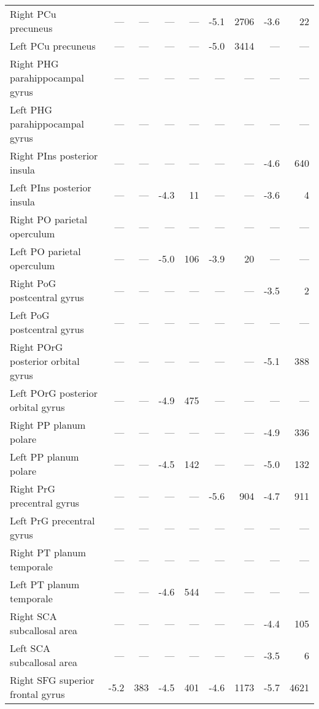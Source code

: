 \documentclass[]{article}
\begin{document}
\begin{table}[ht]
{\begin{tabular}{lrrrrrrrr}
  Right PCu   precuneus & --- & --- & --- & --- & -5.1 & 2706 & -3.6 & 22 \\ 
  Left PCu   precuneus & --- & --- & --- & --- & -5.0 & 3414 & --- & --- \\ 
  Right PHG   parahippocampal gyrus & --- & --- & --- & --- & --- & --- & --- & --- \\ 
  Left PHG   parahippocampal gyrus & --- & --- & --- & --- & --- & --- & --- & --- \\ 
  Right PIns  posterior insula & --- & --- & --- & --- & --- & --- & -4.6 & 640 \\ 
  Left PIns  posterior insula & --- & --- & -4.3 & 11 & --- & --- & -3.6 & 4 \\ 
  Right PO    parietal operculum & --- & --- & --- & --- & --- & --- & --- & --- \\ 
  Left PO    parietal operculum & --- & --- & -5.0 & 106 & -3.9 & 20 & --- & --- \\ 
  Right PoG   postcentral gyrus & --- & --- & --- & --- & --- & --- & -3.5 & 2 \\ 
  Left PoG   postcentral gyrus & --- & --- & --- & --- & --- & --- & --- & --- \\ 
  Right POrG  posterior orbital gyrus & --- & --- & --- & --- & --- & --- & -5.1 & 388 \\ 
  Left POrG  posterior orbital gyrus & --- & --- & -4.9 & 475 & --- & --- & --- & --- \\ 
  Right PP    planum polare & --- & --- & --- & --- & --- & --- & -4.9 & 336 \\ 
  Left PP    planum polare & --- & --- & -4.5 & 142 & --- & --- & -5.0 & 132 \\ 
  Right PrG   precentral gyrus & --- & --- & --- & --- & -5.6 & 904 & -4.7 & 911 \\ 
  Left PrG   precentral gyrus & --- & --- & --- & --- & --- & --- & --- & --- \\ 
  Right PT    planum temporale & --- & --- & --- & --- & --- & --- & --- & --- \\ 
  Left PT    planum temporale & --- & --- & -4.6 & 544 & --- & --- & --- & --- \\ 
  Right SCA   subcallosal area & --- & --- & --- & --- & --- & --- & -4.4 & 105 \\ 
  Left SCA   subcallosal area & --- & --- & --- & --- & --- & --- & -3.5 & 6 \\ 
  Right SFG   superior frontal gyrus & -5.2 & 383 & -4.5 & 401 & -4.6 & 1173 & -5.7 & 4621 \\ 

\end{tabular}}
\end{table}
\end{document}
